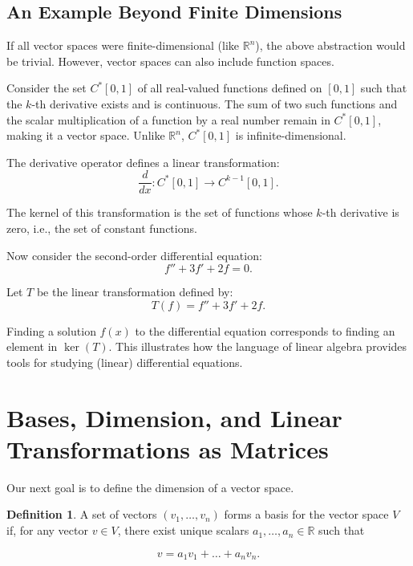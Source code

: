 \documentclass[
]{book}
\theoremstyle{definition}
\newtheorem{definition}{Definition}[chapter]
\theoremstyle{definition}
\theoremstyle{definition}
\theoremstyle{definition}
\theoremstyle{remark}
\begin{document}
\hypertarget{an-example-beyond-finite-dimensions}{%
\subsection{An Example Beyond Finite Dimensions}\label{an-example-beyond-finite-dimensions}}

If all vector spaces were finite-dimensional (like \(\mathbb{R}^n\)), the above abstraction would be trivial. However, vector spaces can also include function spaces.

Consider the set \(C^*[0,1]\) of all real-valued functions defined on \([0,1]\) such that the \(k\)-th derivative exists and is continuous. The sum of two such functions and the scalar multiplication of a function by a real number remain in \(C^*[0,1]\), making it a vector space. Unlike \(\mathbb{R}^n\), \(C^*[0,1]\) is infinite-dimensional.

The derivative operator defines a linear transformation:\\
\[
\frac{d}{dx} : C^*[0,1] \to C^{k-1}[0,1].
\]

The kernel of this transformation is the set of functions whose \(k\)-th derivative is zero, i.e., the set of constant functions.

Now consider the second-order differential equation:\\
\[
f'' + 3f' + 2f = 0.
\]

Let \(T\) be the linear transformation defined by:\\
\[
T(f) = f'' + 3f' + 2f.
\]

Finding a solution \(f(x)\) to the differential equation corresponds to finding an element in \(\ker(T)\). This illustrates how the language of linear algebra provides tools for studying (linear) differential equations.

\hypertarget{bases-dimension-and-linear-transformations-as-matrices}{%
\section{Bases, Dimension, and Linear Transformations as Matrices}\label{bases-dimension-and-linear-transformations-as-matrices}}

Our next goal is to define the dimension of a vector space.

\begin{definition}
A set of vectors \((v_1, \dots, v_n)\) forms a basis for the vector space \(V\) if, for any vector \(v \in V\), there exist unique scalars \(a_1, \dots, a_n \in \mathbb{R}\) such that

\[
v = a_1v_1 + \dots + a_nv_n.
\]
\end{definition}
\end{document}
